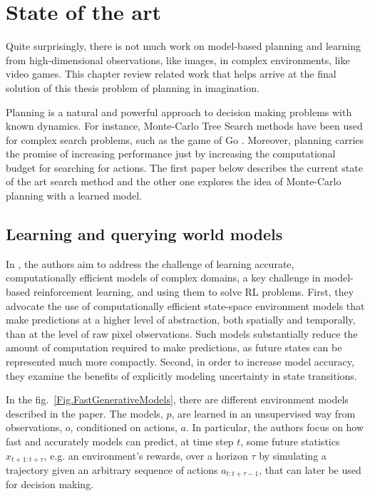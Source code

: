 \section{State of the art}

Quite surprisingly, there is not much work on model-based planning and learning from high-dimensional observations, like images, in complex environments, like video games. This chapter review related work that helps arrive at the final solution of this thesis problem of planning in imagination.

Planning is a natural and powerful approach to decision making problems with known dynamics. For instance, Monte-Carlo Tree Search methods \cite{Algo.MCTS} have been used for complex search problems, such as the game of Go \cite{Algo.AlphaGoZero}. Moreover, planning carries the promise of increasing performance just by increasing the computational budget for searching for actions. The first paper below describes the current state of the art search method and the other one explores the idea of Monte-Carlo planning with a learned model.

\subsection{Learning and querying world models} \label{Sec.FastWorldModels}

In \cite{Algo.FastGenerativeModels}, the authors aim to address the challenge of learning accurate, computationally efficient models of complex domains, a key challenge in model-based reinforcement learning, and using them to solve RL problems. First, they advocate the use of computationally efficient state-space environment models that make predictions at a higher level of abstraction, both spatially and temporally, than at the level of raw pixel observations. Such models substantially reduce the amount of computation required to make predictions, as future states can be represented much more compactly. Second, in order to increase model accuracy, they examine the benefits of explicitly modeling uncertainty in state transitions.

In the fig.~\ref{Fig.FastGenerativeModels}, there are different environment models described in the paper. The models, $p$, are learned in an unsupervised way from observations, $o$, conditioned on actions, $a$. In particular, the authors focus on how fast and accurately models can predict, at time step $t$, some future statistics $x_{t+1:t+\tau}$, e.g. an environment's rewards, over a horizon $\tau$ by simulating a trajectory given an arbitrary sequence of actions $a_{t:t+\tau−1}$, that can later be used for decision making.

